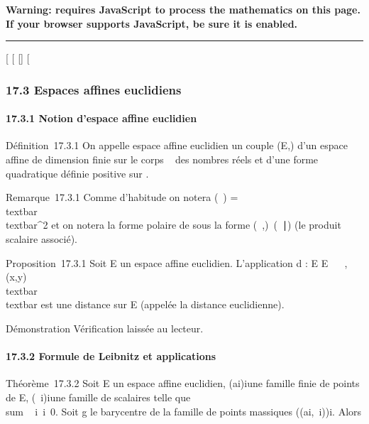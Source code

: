 \textbf{Warning: 
requires JavaScript to process the mathematics on this page.\\ If your
browser supports JavaScript, be sure it is enabled.}

\begin{center}\rule{3in}{0.4pt}\end{center}

{[}
{[}
{[}{]}
{[}

\subsubsection{17.3 Espaces affines euclidiens}

\paragraph{17.3.1 Notion d'espace affine euclidien}

Définition~17.3.1 On appelle espace affine euclidien un couple (E,\Phi)
d'un espace affine de dimension finie sur le corps ~ des nombres réels
et d'une forme quadratique définie positive \Phi sur
\overrightarrowE.

Remarque~17.3.1 Comme d'habitude on notera
\Phi(\overrightarrow\xi~)
=\\textbar{}\overrightarrow
\xi~\\textbar{}^2 et on notera la forme polaire
de \Phi sous la forme
(\overrightarrow\xi~,\overrightarrow\eta)\mapsto~(\overrightarrow\xi~\mathrel∣\overrightarrow\eta)
(le produit scalaire associé).

Proposition~17.3.1 Soit E un espace affine euclidien. L'application d :
E \times E \rightarrow~ ~,
(x,y)\mapsto~\\textbar{}\overrightarrowxy\\textbar{}
est une distance sur E (appelée la distance euclidienne).

Démonstration Vérification laissée au lecteur.

\paragraph{17.3.2 Formule de Leibnitz et applications}

Théorème~17.3.2 Soit E un espace affine euclidien,
(ai)i\inI une famille finie de points de E,
(\lambda~i)i\inI une famille de scalaires telle que
\\sum ~
i\inI\lambda~i\neq~0. Soit g le
barycentre de la famille de points massiques \left
((ai,\lambda~i)\right )i\inI. Alors

